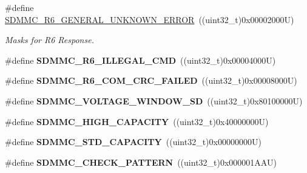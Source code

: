 \begin{DoxyCompactItemize}
\#define \mbox{\hyperlink{group___s_d_m_m_c___l_l___exported___constants_ga0410a94052f5601814d5254de59e740b}{S\+D\+M\+M\+C\+\_\+\+R6\+\_\+\+G\+E\+N\+E\+R\+A\+L\+\_\+\+U\+N\+K\+N\+O\+W\+N\+\_\+\+E\+R\+R\+OR}}~((uint32\+\_\+t)0x00002000\+U)
\begin{DoxyCompactList}\small\item\em Masks for R6 Response. \end{DoxyCompactList}\item 
\mbox{\label{group___s_d_m_m_c___l_l___exported___constants_gadd78e04b5198c860b9cdddffc260da3c}} 
\#define {\bfseries S\+D\+M\+M\+C\+\_\+\+R6\+\_\+\+I\+L\+L\+E\+G\+A\+L\+\_\+\+C\+MD}~((uint32\+\_\+t)0x00004000\+U)
\item 
\mbox{\label{group___s_d_m_m_c___l_l___exported___constants_ga602bc99f0c1ca6f488a3808a8872fe3c}} 
\#define {\bfseries S\+D\+M\+M\+C\+\_\+\+R6\+\_\+\+C\+O\+M\+\_\+\+C\+R\+C\+\_\+\+F\+A\+I\+L\+ED}~((uint32\+\_\+t)0x00008000\+U)
\item 
\mbox{\label{group___s_d_m_m_c___l_l___exported___constants_gaddf07d7d4d0b87952db9c42b24dda13c}} 
\#define {\bfseries S\+D\+M\+M\+C\+\_\+\+V\+O\+L\+T\+A\+G\+E\+\_\+\+W\+I\+N\+D\+O\+W\+\_\+\+SD}~((uint32\+\_\+t)0x80100000\+U)
\item 
\mbox{\label{group___s_d_m_m_c___l_l___exported___constants_gabe9628f2bdbbe00ffea8c3c6f02d39f7}} 
\#define {\bfseries S\+D\+M\+M\+C\+\_\+\+H\+I\+G\+H\+\_\+\+C\+A\+P\+A\+C\+I\+TY}~((uint32\+\_\+t)0x40000000\+U)
\item 
\mbox{\label{group___s_d_m_m_c___l_l___exported___constants_gab33b522deae8af9160d370f7da0bb09f}} 
\#define {\bfseries S\+D\+M\+M\+C\+\_\+\+S\+T\+D\+\_\+\+C\+A\+P\+A\+C\+I\+TY}~((uint32\+\_\+t)0x00000000\+U)
\item 
\mbox{\label{group___s_d_m_m_c___l_l___exported___constants_gaf737986d1e4310c7bf7ca8f49a5d55fe}} 
\#define {\bfseries S\+D\+M\+M\+C\+\_\+\+C\+H\+E\+C\+K\+\_\+\+P\+A\+T\+T\+E\+RN}~((uint32\+\_\+t)0x000001\+A\+A\+U)
\item 

\end{DoxyCompactItemize}

